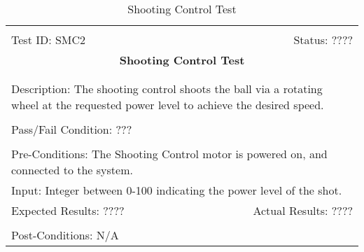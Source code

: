 \documentclass[11pt]{article}
\begin{document}
\begin{center}
\begin{table}[H]
\begin{tabular}{|l r|}\hline&\\[-2mm]
	Test ID: SMC2	&Status: ????\\[-3mm]
	\multicolumn{2}{|c|}{\textbf{\large{Shooting Control Test}}}\\&\\\hline&\\[-3mm]
	\multicolumn{2}{|p{\textwidth}|}{Description: The shooting control shoots the ball via a rotating wheel at the requested power level to achieve the desired speed.}\\[1mm]\hline&\\[-3mm]
	\multicolumn{2}{|p{\textwidth}|}{Pass/Fail Condition: ???}\\[1mm]\hline&\\[-3mm]
	\multicolumn{2}{|p{\textwidth}|}{Pre-Conditions: The Shooting Control motor is powered on, and connected to the system.}\\[4mm]
	\multicolumn{2}{|p{\textwidth}|}{Input: Integer between 0-100 indicating the power level of the shot.
}\\[2mm]\hline
	\multicolumn{1}{|p{0.49\textwidth}}{Expected Results: ????}	&\multicolumn{1}{|p{0.45\textwidth}|}{Actual Results: ????}\\\hline&\\[-3mm]
	\multicolumn{2}{|p{\textwidth}|}{Post-Conditions: N/A}\\\hline
\end{tabular}
\caption{Shooting Control Test}
\end{table}
\end{center}
\end{document}
